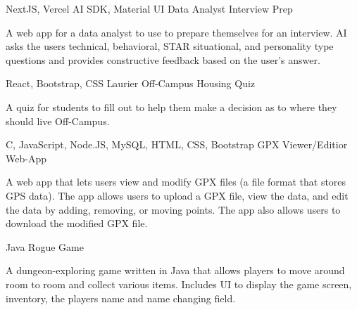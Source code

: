 


\begin{cventries}


\cventry
{NextJS, Vercel AI SDK, Material UI} %
{Data Analyst Interview Prep} %
{}
{}
{ %
\begin{cvitems}
\item {A web app for a data analyst to use to prepare themselves for an interview. AI asks the users technical, behavioral, STAR situational, and personality type questions and provides constructive feedback based on the user's answer.}
\end{cvitems}
}

\cventry
{React, Bootstrap, CSS} %
{Laurier Off-Campus Housing Quiz} %
{}
{}
{ %
\begin{cvitems}
\item {A quiz for students to fill out to help them make a decision as to where they should live Off-Campus.}
\end{cvitems}
}


\cventry
{C, JavaScript, Node.JS, MySQL, HTML, CSS, Bootstrap} %
{GPX Viewer/Editior Web-App} %
{}
{}
{ %
\begin{cvitems}
\item {A web app that lets users view and modify GPX files (a file format that stores GPS data). The app allows users to upload a GPX file, view the data, and edit the data by adding, removing, or moving points. The app also allows users to download the modified GPX file.}
\end{cvitems}
}

\cventry
{Java} %
{Rogue Game} %
{}
{}
{ %
\begin{cvitems}
\item {A dungeon-exploring game written in Java that allows players to move around room to room and collect various items. Includes UI to display the game screen, inventory, the players name and name changing field.}
\end{cvitems}
}


\end{cventries}